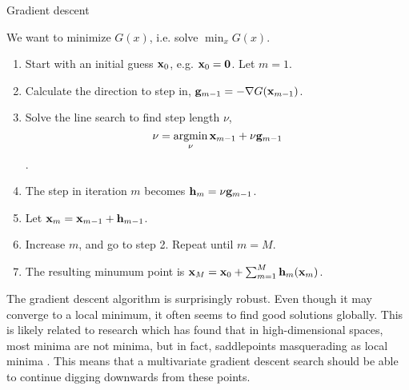 \begin{algorithm}
\caption{Gradient descent}
\label{algo:grad-desc}
We want to minimize $G(x)$, i.e. solve $\min_{x}G(x)$.
\begin{enumerate}
    \item Start with an initial guess $\mathbf{x}_0$, e.g. $\mathbf{x}_0=\mathbf{0}$. Let $m=1$.
    \item Calculate the direction to step in, $\mathbf{g}_{m-1}=-\nabla G(\mathbf{x}_{m-1})$.
    \item Solve the line search to find step length $\nu$,
        \begin{equation*}
            \nu=\operatorname*{argmin}_{\nu}\mathbf{x}_{m-1}+\nu \mathbf{g}_{m-1}
        \end{equation*}.
    \item The step in iteration $m$ becomes $\mathbf{h}_m=\nu \mathbf{g}_{m-1}$.
    \item Let $\mathbf{x}_m=\mathbf{x}_{m-1}+\mathbf{h}_{m-1}$.
    \item Increase $m$, and go to step 2. Repeat until $m=M$.
    \item The resulting minumum point is $\mathbf{x}_M=\mathbf{x}_0+\sum_{m=1}^M\mathbf{h}_m(\mathbf{x}_m)$.
\end{enumerate}
\end{algorithm}
The gradient descent algorithm is surprisingly robust. Even though it may converge to a local minimum, it often seems to find good solutions globally. This is likely related to research which has found that in high-dimensional spaces, most minima are not minima, but in fact, saddlepoints masquerading as local minima \citep{saddlepoints}. This means that a multivariate gradient descent search should be able to continue digging downwards from these points.

